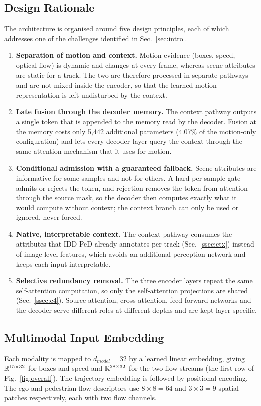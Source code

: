 \subsection{Design Rationale}\label{ssec:rationale}
The architecture is organised around five design principles, each of which addresses one of the challenges identified in Sec.~\ref{sec:intro}.
\begin{enumerate}[leftmargin=1.6em,itemsep=1pt,topsep=2pt]
\item \textbf{Separation of motion and context.} Motion evidence (boxes, speed, optical flow) is dynamic and changes at every frame, whereas scene attributes are static for a track. The two are therefore processed in separate pathways and are not mixed inside the encoder, so that the learned motion representation is left undisturbed by the context.
\item \textbf{Late fusion through the decoder memory.} The context pathway outputs a single token that is appended to the memory read by the decoder. Fusion at the memory costs only 5,442 additional parameters (4.07\% of the motion-only configuration) and lets every decoder layer query the context through the same attention mechanism that it uses for motion.
\item \textbf{Conditional admission with a guaranteed fallback.} Scene attributes are informative for some samples and not for others. A hard per-sample gate admits or rejects the token, and rejection removes the token from attention through the source mask, so the decoder then computes exactly what it would compute without context; the context branch can only be used or ignored, never forced.
\item \textbf{Native, interpretable context.} The context pathway consumes the attributes that IDD-PeD already annotates per track (Sec.~\ref{ssec:ctx}) instead of image-level features, which avoids an additional perception network and keeps each input interpretable.
\item \textbf{Selective redundancy removal.} The three encoder layers repeat the same self-attention computation, so only the self-attention projections are shared (Sec.~\ref{ssec:c4}). Source attention, cross attention, feed-forward networks and the decoder serve different roles at different depths and are kept layer-specific.
\end{enumerate}

\subsection{Multimodal Input Embedding}\label{ssec:embed}
Each modality is mapped to $d_{model}{=}32$ by a learned linear embedding, giving $\mathbb{R}^{15\times32}$ for boxes and speed and $\mathbb{R}^{28\times32}$ for the two flow streams (the first row of Fig.~\ref{fig:overall}). The trajectory embedding is followed by positional encoding. The ego and pedestrian flow descriptors use $8{\times}8{=}64$ and $3{\times}3{=}9$ spatial patches respectively, each with two flow channels.

